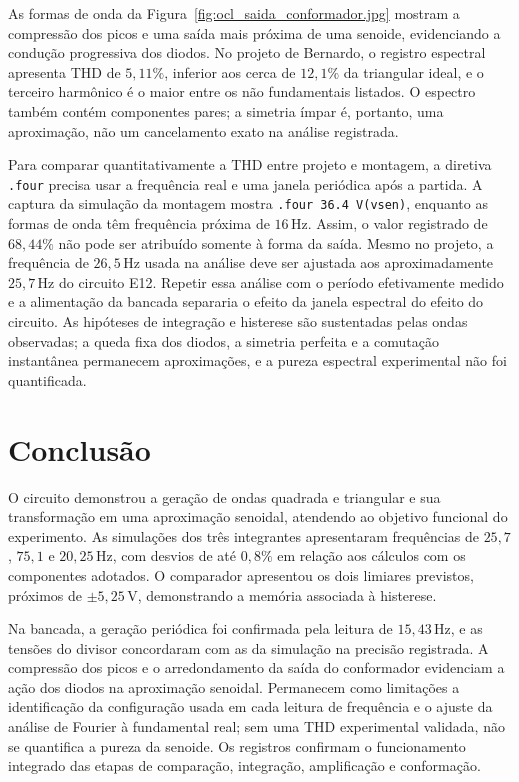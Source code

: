 \documentclass[11pt,a4paper]{article}
\begin{document}
As formas de onda da Figura~\ref{fig:ocl_saida_conformador.jpg} mostram a
compressão dos picos e uma saída mais próxima de uma senoide, evidenciando
a condução progressiva dos diodos. No projeto de Bernardo, o registro
espectral apresenta THD de $5{,}11\%$, inferior aos cerca de $12{,}1\%$
da triangular ideal, e o terceiro harmônico é o maior entre os não
fundamentais listados. O espectro também contém componentes pares;
a simetria ímpar é, portanto, uma aproximação, não um cancelamento
exato na análise registrada.

Para comparar quantitativamente a THD entre projeto e montagem, a diretiva
\texttt{.four} precisa usar a frequência real e uma janela periódica após
a partida. A captura da simulação da montagem mostra
\texttt{.four 36.4 V(vsen)}, enquanto as formas de onda têm frequência
próxima de $16\,\mathrm{Hz}$. Assim, o valor registrado de $68{,}44\%$
não pode ser atribuído somente à forma da saída. Mesmo no projeto,
a frequência de $26{,}5\,\mathrm{Hz}$ usada na análise deve ser ajustada
aos aproximadamente $25{,}7\,\mathrm{Hz}$ do circuito E12.
Repetir essa análise com o período efetivamente medido e a alimentação
da bancada separaria o efeito da janela espectral do efeito do circuito.
As hipóteses de integração e histerese são sustentadas pelas ondas
observadas; a queda fixa dos diodos, a simetria perfeita e a comutação
instantânea permanecem aproximações, e a pureza espectral experimental
não foi quantificada.

\endgroup

\section{Conclusão}

O circuito demonstrou a geração de ondas quadrada e triangular e sua
transformação em uma aproximação senoidal, atendendo ao objetivo
funcional do experimento. As simulações
dos três integrantes apresentaram frequências de $25{,}7$, $75{,}1$ e
$20{,}25\,\mathrm{Hz}$, com desvios de até $0{,}8\%$ em relação aos
cálculos com os componentes adotados. O comparador apresentou os dois
limiares previstos, próximos de $\pm5{,}25\,\mathrm{V}$, demonstrando a
memória associada à histerese.

Na bancada, a geração periódica foi confirmada pela leitura de
$15{,}43\,\mathrm{Hz}$, e as tensões do divisor concordaram com as da
simulação na precisão registrada. A compressão dos picos e o
arredondamento da saída do conformador evidenciam a ação dos diodos na
aproximação senoidal. Permanecem como limitações a identificação da
configuração usada em cada leitura de frequência e o ajuste da análise
de Fourier à fundamental real; sem uma THD experimental validada, não
se quantifica a pureza da senoide. Os registros confirmam o funcionamento integrado das etapas de
comparação, integração, amplificação e conformação.
\end{document}
